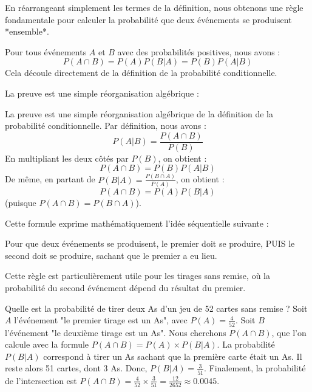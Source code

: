 En réarrangeant simplement les termes de la définition, nous obtenons une règle fondamentale pour calculer la probabilité que deux événements se produisent *ensemble*.

\begin{theorembox}
Pour tous événements $A$ et $B$ avec des probabilités positives, nous avons :
$$P(A \cap B) = P(A)P(B|A) = P(B)P(A|B)$$
Cela découle directement de la définition de la probabilité conditionnelle.
\end{theorembox}

La preuve est une simple réorganisation algébrique :

\begin{proofbox}
La preuve est une simple réorganisation algébrique de la définition de la probabilité conditionnelle.
Par définition, nous avons :
$$P(A|B) = \frac{P(A \cap B)}{P(B)}$$
En multipliant les deux côtés par $P(B)$, on obtient :
$$P(A \cap B) = P(B)P(A|B)$$
De même, en partant de $P(B|A) = \frac{P(B \cap A)}{P(A)}$, on obtient :
$$P(A \cap B) = P(A)P(B|A)$$
(puisque $P(A \cap B) = P(B \cap A)$).
\end{proofbox}

Cette formule exprime mathématiquement l'idée séquentielle suivante :

\begin{intuitionbox}
Pour que deux événements se produisent, le premier doit se produire, PUIS le second doit se produire, sachant que le premier a eu lieu.
\end{intuitionbox}

Cette règle est particulièrement utile pour les tirages sans remise, où la probabilité du second événement dépend du résultat du premier.

\begin{examplebox}
Quelle est la probabilité de tirer deux As d'un jeu de 52 cartes sans remise ?
Soit $A$ l'événement "le premier tirage est un As", avec $P(A) = \frac{4}{52}$. Soit $B$ l'événement "le deuxième tirage est un As". Nous cherchons $P(A \cap B)$, que l'on calcule avec la formule $P(A \cap B) = P(A) \times P(B|A)$. La probabilité $P(B|A)$ correspond à tirer un As sachant que la première carte était un As. Il reste alors 51 cartes, dont 3 As. Donc, $P(B|A) = \frac{3}{51}$. Finalement, la probabilité de l'intersection est $P(A \cap B) = \frac{4}{52} \times \frac{3}{51} = \frac{12}{2652} \approx 0.0045$.
\end{examplebox}

